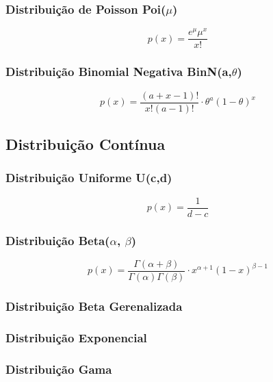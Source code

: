 \subsubsection{Distribuição de Poisson Poi($\mu$)}

\begin{equation}
    p(x) = \frac{e^\mu \mu^x}{x!}
\end{equation}

\subsubsection{Distribuição Binomial Negativa BinN(a,$\theta$)}

\begin{equation}
    p(x) = \frac{(a + x - 1)!}{x! (a-1)!} \cdot \theta^a(1-\theta)^x
\end{equation}

\subsection{Distribuição Contínua}

\subsubsection{Distribuição Uniforme U(c,d)}

\begin{equation}
    p(x) = \frac{1}{d-c}
\end{equation}

\subsubsection{Distribuição Beta($\alpha$, $\beta$)}

\begin{equation}
    p(x) = \frac{\Gamma(\alpha+\beta)}{\Gamma(\alpha) \Gamma(\beta)} \cdot x^{\alpha+1} (1-x)^{\beta-1}
\end{equation}

\subsubsection{Distribuição Beta Gerenalizada}

\subsubsection{Distribuição Exponencial}

\subsubsection{Distribuição Gama}

